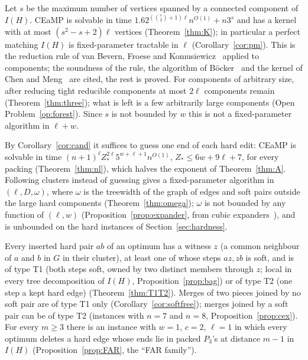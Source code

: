  Let $s$ be the maximum number of vertices spanned by a connected component of $I(H)$. CEaMP is solvable in time $1.62^{(\binom s2+1)\ell}n^{O(1)}+n3^s$ and has a kernel with at most $(s^2-s+2)\ell$ vertices (Theorem~\ref{thm:K}); in particular a perfect matching $I(H)$ is fixed-parameter tractable in $\ell$ (Corollary~\ref{cor:pm}). This is the reduction rule of van Bevern, Froese and Komusiewicz~\cite{BFK18} applied to components; the soundness of the rule, the algorithm of B\"ocker~\cite{Boe12} and the kernel of Chen and Meng~\cite{CM12} are cited, the rest is proved. For components of arbitrary size, after reducing tight reducible components at most $2\ell$ components remain (Theorem~\ref{thm:three}); what is left is a few arbitrarily large components (Open Problem~\ref{op:forest}). Since $s$ is not bounded by $w$ this is not a fixed-parameter algorithm in $\ell+w$.

 By Corollary~\ref{cor:cand} it suffices to guess one end of each hard edit: CEaMP is solvable in time $(n+1)^{\ell}Z_*^{2\ell}5^{w+\ell+1}n^{O(1)}$, $Z_*\le6w+9\ell+7$, for every packing (Theorem~\ref{thm:nl}), which halves the exponent of Theorem~\ref{thm:A}. Following clusters instead of guessing gives a fixed-parameter algorithm in $(\ell,D,\omega)$, where $\omega$ is the treewidth of the graph of edges and soft pairs outside the large hard components (Theorem~\ref{thm:omega}); $\omega$ is not bounded by any function of $(\ell,w)$ (Proposition~\ref{prop:expander}, from cubic expanders~\cite{GM09}), and is unbounded on the hard instances of Section~\ref{sec:hardness}.

 Every inserted hard pair $ab$ of an optimum has a witness $z$ (a common neighbour of $a$ and $b$ in $G$ in their cluster), at least one of whose steps $az,zb$ is soft, and is of type T1 (both steps soft, owned by two distinct members through $z$; local in every tree decomposition of $I(H)$, Proposition~\ref{prop:bag}) or of type T2 (one step a kept hard edge) (Theorem~\ref{thm:T1T2}). Merges of two pieces joined by no soft pair are of type T1 only (Corollary~\ref{cor:softfree}); merges joined by a soft pair can be of type T2 (instances with $n=7$ and $n=8$, Proposition~\ref{prop:cex}). For every $m\ge3$ there is an instance with $w=1$, $c=2$, $\ell=1$ in which every optimum deletes a hard edge whose ends lie in packed $P_3$'s at distance $m-1$ in $I(H)$ (Proposition~\ref{prop:FAR}, the ``FAR family'').

